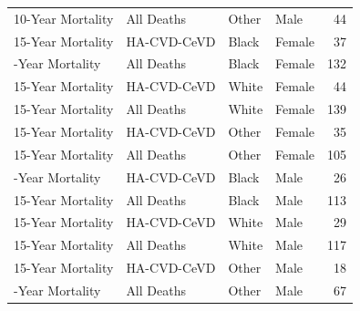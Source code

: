 \documentclass[
]{article}
\begin{document}
\begin{table}
\begin{tabular}[t]{llllr}
10-Year Mortality & All Deaths & Other & Male & 44\\
15-Year Mortality & HA-CVD-CeVD & Black & Female & 37\\
\addlinespace
15-Year Mortality & All Deaths & Black & Female & 132\\
15-Year Mortality & HA-CVD-CeVD & White & Female & 44\\
15-Year Mortality & All Deaths & White & Female & 139\\
15-Year Mortality & HA-CVD-CeVD & Other & Female & 35\\
15-Year Mortality & All Deaths & Other & Female & 105\\
\addlinespace
15-Year Mortality & HA-CVD-CeVD & Black & Male & 26\\
15-Year Mortality & All Deaths & Black & Male & 113\\
15-Year Mortality & HA-CVD-CeVD & White & Male & 29\\
15-Year Mortality & All Deaths & White & Male & 117\\
15-Year Mortality & HA-CVD-CeVD & Other & Male & 18\\
\addlinespace
15-Year Mortality & All Deaths & Other & Male & 67\\
\bottomrule
\end{tabular}
\end{table}
\end{document}

